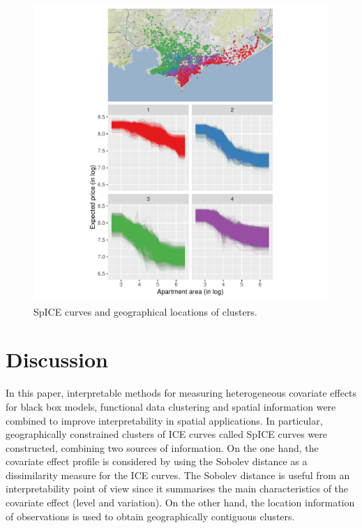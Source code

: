 \documentclass[smallextended,natbib]{svjour3}\usepackage[]{graphicx}\usepackage[]{xcolor}
\begin{document}
\begin{figure} 
    \centering
    \includegraphics[scale=0.9]{figures/fig-4grupos-alpha5.pdf}
    \caption{SpICE curves and geographical locations of clusters.}
    \label{fig-spice}
\end{figure}



\section{Discussion} \label{section:4}

In this paper, interpretable methods for measuring heterogeneous covariate effects for black box models, functional data clustering and spatial information were combined to improve interpretability in spatial applications. In particular, geographically constrained clusters of ICE curves called SpICE curves were constructed, combining two sources of information.  On the one hand, the covariate effect profile is considered by using the Sobolev distance as a dissimilarity measure for the ICE curves. The Sobolev distance is useful from an interpretability point of view since it summarises the main characteristics of the covariate effect (level and variation). On the other hand, the location information of observations is used to obtain geographically contiguous clusters. 
\end{document}
